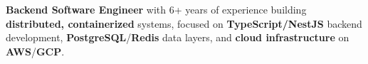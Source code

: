

\begin{cvparagraph}

\textbf{Backend Software Engineer} with 6+ years of experience building \textbf{distributed, containerized} systems, focused on \textbf{TypeScript/NestJS} backend development, \textbf{PostgreSQL}/\textbf{Redis} data layers, and \textbf{cloud infrastructure} on \textbf{AWS}/\textbf{GCP}.
\end{cvparagraph}
